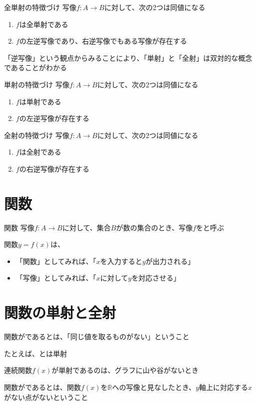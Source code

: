 \documentclass[b5paper,12pt,notitlepage]{jsreport}
\begin{document}
\begin{theorem}{全単射の特徴づけ}
  写像$f\colon A \to B$に対して、次の2つは同値になる
  \begin{enumerate}
    \item $f$は全単射である
    \item $f$の左逆写像であり、右逆写像でもある写像が存在する
  \end{enumerate}
\end{theorem}

\sectionline

「逆写像」という観点からみることにより、「単射」と「全射」は双対的な概念であることがわかる

\begin{theorem}{単射の特徴づけ}
  写像$f\colon A \to B$に対して、次の2つは同値になる
  \begin{enumerate}
    \item $f$は単射である
    \item $f$の左逆写像が存在する
  \end{enumerate}
\end{theorem}

\begin{theorem}{全射の特徴づけ}
  写像$f\colon A \to B$に対して、次の2つは同値になる
  \begin{enumerate}
    \item $f$は全射である
    \item $f$の右逆写像が存在する
  \end{enumerate}
\end{theorem}

\sectionline
\section{関数}

\begin{definition}{関数}
  写像$f\colon A \to B$に対して、集合$B$が数の集合のとき、写像$f$をと呼ぶ
\end{definition}

関数$y=f(x)$は、
\begin{itemize}
  \item 「関数」としてみれば、「$x$を入力すると$y$が出力される」
  \item 「写像」としてみれば、「$x$に対して$y$を対応させる」
\end{itemize}

\sectionline
\section{関数の単射と全射}

関数がであるとは、「同じ値を取るものがない」ということ

たとえば、とは単射

連続関数$f(x)$が単射であるのは、グラフに山や谷がないとき

\sectionline

関数がであるとは、関数$f(x)$を$\mathbb{R}$への写像と見なしたとき、$y$軸上に対応する$x$がない点がないということ
\end{document}
